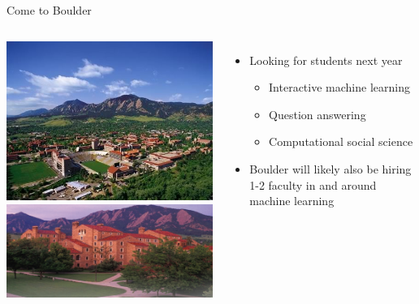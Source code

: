 \documentclass[compress]{beamer}
\begin{document}
\begin{frame}{Come to Boulder}

\begin{columns}
		\includegraphics[width=.9\linewidth]{colorado/boulder} \\
		\includegraphics[width=.9\linewidth]{colorado/cs_dept}		
		\begin{itemize}
			\item Looking for students next year
			\begin{itemize}
				\item Interactive machine learning
				\item Question answering
				\item Computational social science
			\end{itemize}
			\item Boulder will likely also be hiring 1-2 faculty in and around machine learning
		\end{itemize}
\end{columns}

\end{frame}
\end{document}
